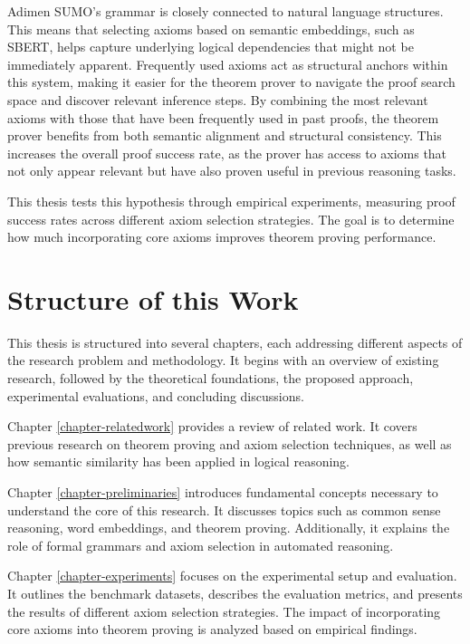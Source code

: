 \documentclass[english,version-2020-11]{uzl-thesis}
\begin{document}
Adimen SUMO's grammar is closely connected to natural language structures.
This means that selecting axioms based on semantic embeddings, such as SBERT, helps capture underlying logical dependencies that might not be immediately apparent. Frequently used axioms act as structural anchors within this system, making it easier for the theorem prover to navigate the proof search space and discover relevant inference steps.
By combining the most relevant axioms with those that have been frequently used in past proofs, the theorem prover benefits from both semantic alignment and structural consistency. This increases the overall proof success rate, as the prover has access to axioms that not only appear relevant but have also proven useful in previous reasoning tasks.

This thesis tests this hypothesis through empirical experiments, measuring proof success rates across different axiom selection strategies. The goal is to determine how much incorporating core axioms improves theorem proving performance.

\section{Structure of this Work}

This thesis is structured into several chapters, each addressing different aspects of the research problem and methodology. It begins with an overview of existing research, followed by the theoretical foundations, the proposed approach, experimental evaluations, and concluding discussions.

Chapter \ref{chapter-relatedwork} provides a review of related work. It covers previous research on theorem proving and axiom selection techniques, as well as how semantic similarity has been applied in logical reasoning.

Chapter \ref{chapter-preliminaries} introduces fundamental concepts necessary to understand the core of this research. It discusses topics such as common sense reasoning, word embeddings, and theorem proving. Additionally, it explains the role of formal grammars and axiom selection in automated reasoning.

Chapter \ref{chapter-experiments} focuses on the experimental setup and evaluation. It outlines the benchmark datasets, describes the evaluation metrics, and presents the results of different axiom selection strategies. The impact of incorporating core axioms into theorem proving is analyzed based on empirical findings.
\end{document}
